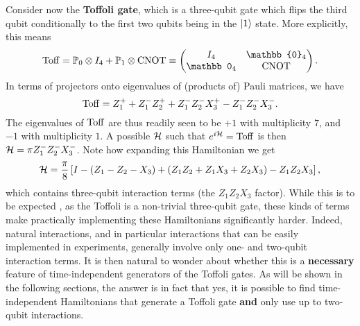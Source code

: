 \begin{example}[label={ex:eigendecomposition_Toffoli}]
Consider now the \textbf{Toffoli gate}, which is a three-qubit gate which flips the third qubit conditionally to the first two qubits being in the $\ket1$ state.
More explicitly, this means
\begin{equation}
    \Toff =
    \PP_0\otimes I_4 + \PP_1\otimes\CNOT
    \equiv
    \begin{pmatrix}
        I_4 & \mathbb{0}_4 \\
        \mathbb 0_4 & \CNOT
    \end{pmatrix}.
\end{equation}
In terms of projectors onto eigenvalues of (products of) Pauli matrices, we have
\begin{equation}
    \operatorname{Toff} = Z_1^+ + Z_1^- Z_2^+ + Z_1^- Z_2^- X_3^+ - Z_1^- Z_2^- X_3^-.
\end{equation}
The eigenvalues of $\operatorname{Toff}$ are thus readily seen to be $+1$ with multiplicity $7$, and $-1$ with multiplicity $1$.
A possible ${\mathcal{H}}$ such that $e^{i\cal H}=\operatorname{Toff}$ is then ${\mathcal{H}}=\pi Z_1^- Z_2^- X_3^-$.
Note how expanding this Hamiltonian we get
\begin{equation}
    {\mathcal{H}} = \frac{\pi}{8}\left[
        I - (Z_1 - Z_2 - X_3)
        + (Z_1 Z_2 + Z_1 X_3 + Z_2 X_3)
        - Z_1 Z_2 X_3
    \right],
\end{equation}
which contains three-qubit interaction terms (the $Z_1 Z_2 X_3$ factor). While this is to be expected , as the Toffoli is a non-trivial three-qubit gate, these kinds of terms make practically implementing these Hamiltonians significantly harder.
Indeed, natural interactions, and in particular interactions that can be easily implemented in experiments, generally  involve only one- and two-qubit interaction terms.
It is then natural to wonder about whether this is a \textbf{necessary} feature of time-independent generators of the Toffoli gates.
As will be shown in the following sections, the answer is in fact that yes, it is possible to find time-independent Hamiltonians that generate a Toffoli gate \textbf{and} only use up to two-qubit interactions.
\end{example}

